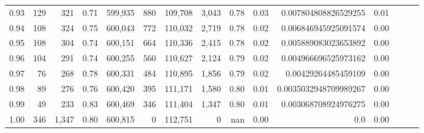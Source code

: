 \begin{tabular}{rrrrrrrrrrrrrrr}
0.93 &     129 &    321 &  0.71 &  599,935 &      880 &  109,708 &    3,043 &  0.78 &  0.03 &   0.007804808826529255 &      0.01 \\
0.94 &     108 &    324 &  0.75 &  600,043 &      772 &  110,032 &    2,719 &  0.78 &  0.02 &   0.006846945925091574 &      0.00 \\
0.95 &     108 &    304 &  0.74 &  600,151 &      664 &  110,336 &    2,415 &  0.78 &  0.02 &   0.005889083023653892 &      0.00 \\
0.96 &     104 &    291 &  0.74 &  600,255 &      560 &  110,627 &    2,124 &  0.79 &  0.02 &   0.004966696525973162 &      0.00 \\
0.97 &      76 &    268 &  0.78 &  600,331 &      484 &  110,895 &    1,856 &  0.79 &  0.02 &    0.00429264485459109 &      0.00 \\
0.98 &      89 &    276 &  0.76 &  600,420 &      395 &  111,171 &    1,580 &  0.80 &  0.01 &  0.0035032948709989267 &      0.00 \\
0.99 &      49 &    233 &  0.83 &  600,469 &      346 &  111,404 &    1,347 &  0.80 &  0.01 &   0.003068708924976275 &      0.00 \\
1.00 &     346 &  1,347 &  0.80 &  600,815 &        0 &  112,751 &        0 &   nan &  0.00 &                    0.0 &      0.00 \\
\bottomrule
\end{tabular}
